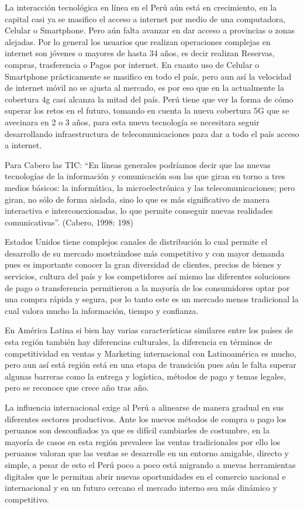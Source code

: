 La interacción tecnológica en línea en el Perú aún está en crecimiento, en la capital casi ya se masifico el acceso a internet por medio de una computadora, Celular o Smartphone. Pero aún falta avanzar en dar acceso a provincias o zonas alejadas. Por lo general los usuarios que realizan operaciones complejas en internet son jóvenes o mayores de hasta 34 años, es decir realizan Reservas, compras, trasferencia o Pagos por internet. En cuanto uso de Celular o Smartphone prácticamente se masifico en todo el país, pero aun así la velocidad de internet móvil no se ajusta al mercado, es por eso que en la actualmente la cobertura 4g casi alcanza la mitad del país. Perú tiene que ver la forma de cómo superar los retos en el futuro, tomando en cuenta la nueva cobertura 5G que se avecinara en 2 o 3 años, para esta nueva tecnología se necesitara seguir desarrollando infraestructura de telecomunicaciones para dar a todo el país acceso a internet.

Para Cabero las TIC: “En líneas generales podríamos decir que las nuevas tecnologías de la información y comunicación son las que giran en torno a tres medios básicos: la informática, la microelectrónica y las telecomunicaciones; pero giran, no sólo de forma aislada, sino lo que es más significativo de manera interactiva e interconexionadas, lo que permite conseguir nuevas realidades comunicativas”. (Cabero, 1998: 198) 

Estados Unidos tiene complejos canales de distribución lo cual permite el desarrollo de su mercado mostrándose más competitivo y con mayor demanda pues es importante conocer la gran diversidad de clientes, precios de bienes y servicios, cultura del país y los competidores así mismo las diferentes soluciones de pago o transferencia permitieron a la mayoría de los consumidores optar por una compra rápida y segura, por lo tanto este es un mercado menos tradicional la cual valora mucho la información, tiempo y confianza.

En América Latina si bien hay varias características similares entre los países de esta región también hay diferencias culturales, la diferencia en términos de competitividad en ventas y Marketing internacional con Latinoamérica es mucho, pero aun así está región está en una etapa de transición pues aún le falta superar algunas barreras como la entrega y logística, métodos de pago y temas legales, pero se reconoce que crece año tras año.

La influencia internacional exige al Perú a alinearse de manera gradual en sus diferentes sectores productivos. Ante los nuevos métodos de compra o pago los peruanos son desconfiados ya que es difícil cambiarles de costumbre, en la mayoría de casos en esta región prevalece las ventas tradicionales por ello los peruanos valoran que las ventas se desarrolle en un entorno amigable, directo y simple, a pesar de esto el Perú poco a poco está migrando a nuevas herramientas digitales que le permitan abrir nuevas oportunidades en el comercio nacional e internacional y en un futuro cercano el  mercado interno sea más dinámico y competitivo.

